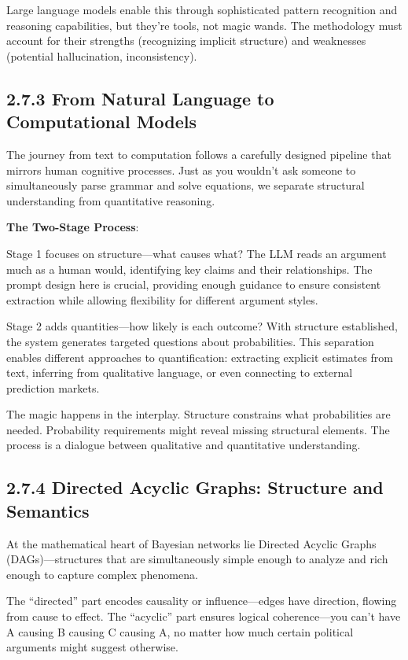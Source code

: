 \documentclass[
  11pt,
  letterpaper,
]{book}
\begin{document}
Large language models enable this through sophisticated pattern
recognition and reasoning capabilities, but they're tools, not magic
wands. The methodology must account for their strengths (recognizing
implicit structure) and weaknesses (potential hallucination,
inconsistency).

\subsection{2.7.3 From Natural Language to Computational
Models}\label{sec-natural-to-computational}

The journey from text to computation follows a carefully designed
pipeline that mirrors human cognitive processes. Just as you wouldn't
ask someone to simultaneously parse grammar and solve equations, we
separate structural understanding from quantitative reasoning.

\textbf{The Two-Stage Process}:

Stage 1 focuses on structure---what causes what? The LLM reads an
argument much as a human would, identifying key claims and their
relationships. The prompt design here is crucial, providing enough
guidance to ensure consistent extraction while allowing flexibility for
different argument styles.

Stage 2 adds quantities---how likely is each outcome? With structure
established, the system generates targeted questions about
probabilities. This separation enables different approaches to
quantification: extracting explicit estimates from text, inferring from
qualitative language, or even connecting to external prediction markets.

The magic happens in the interplay. Structure constrains what
probabilities are needed. Probability requirements might reveal missing
structural elements. The process is a dialogue between qualitative and
quantitative understanding.

\subsection{2.7.4 Directed Acyclic Graphs: Structure and
Semantics}\label{sec-dag-structure}

At the mathematical heart of Bayesian networks lie Directed Acyclic
Graphs (DAGs)---structures that are simultaneously simple enough to
analyze and rich enough to capture complex phenomena.

The ``directed'' part encodes causality or influence---edges have
direction, flowing from cause to effect. The ``acyclic'' part ensures
logical coherence---you can't have A causing B causing C causing A, no
matter how much certain political arguments might suggest otherwise.
\end{document}
